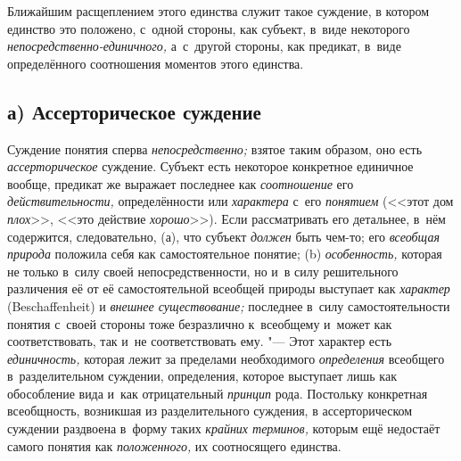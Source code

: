 Ближайшим расщеплением этого единства служит такое суждение, в
котором единство это положено, с~одной стороны, как субъект, в~виде
некоторого
{\em непосредственно-единичного,}
а~с~другой стороны, как предикат, в~виде определённого
соотношения моментов этого единства.

\subsection[а) Ассерторическое суждение]{а) Ассерторическое суждение}

Суждение понятия сперва
{\em непосредственно;}
взятое таким образом, оно есть
{\em ассерторическое}
суждение. Субъект есть некоторое конкретное единичное вообще,
предикат же выражает последнее как
{\em соотношение} его
{\em действительности,}
определённости или
{\em характера} с~его
{\em понятием} (<<этот дом
{\em плох}>>, <<это
действие {\em хорошо}>>).
Если рассматривать его детальнее, в~нём содержится,
следовательно, (а), что субъект
{\em должен} быть чем-то;
его {\em всеобщая природа}
положила себя как самостоятельное понятие; (b)
{\em особенность,}
которая не только в~силу своей непосредственности, но и~в
силу решительного различения её от её самостоятельной всеобщей природы
выступает как {\em характер}
(Beschaf\-fenheit) и
{\em внешнее существование;}
последнее в~силу самостоятельности понятия с~своей стороны
тоже безразлично к~всеобщему и~может как соответствовать, так и~не
соответствовать ему. "--- Этот характер есть
{\em единичность,}
которая лежит за пределами необходимого
{\em определения}
всеобщего в~разделительном суждении, определения, которое
выступает лишь как обособление вида и~как отрицательный
{\em принцип} рода.
Постольку конкретная всеобщность, возникшая из разделительного суждения, в
ассерторическом суждении раздвоена в~форму таких
{\em крайних терминов,}
которым ещё недостаёт самого понятия как
{\em положенного,} их
соотносящего
единства.

